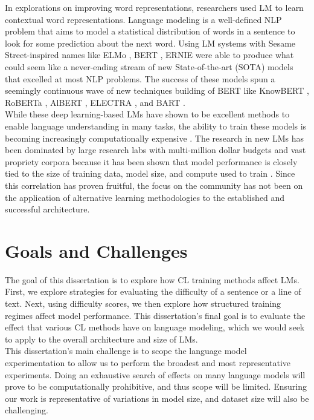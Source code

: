 In explorations on improving word representations, researchers used LM to learn contextual word representations. Language modeling is a well-defined NLP problem that aims to model a statistical distribution of words in a sentence to look for some prediction about the next word. Using LM systems with Sesame Street-inspired names like ELMo \cite{Peters2019KnowledgeEC}, BERT \cite{Devlin2019BERTPO}, ERNIE \cite{Sun2019ERNIEER} were able to produce what could seem like a never-ending stream of new State-of-the-art (SOTA) models that excelled at most NLP problems. The success of these models spun a seemingly continuous wave of new techniques building of BERT like KnowBERT \cite{Peters2019KnowledgeEC}, RoBERTa \cite{Liu2019RoBERTaAR}, AlBERT \cite{Lan2019ALBERTAL}, ELECTRA \cite{Clark2020ELECTRAPT}, and BART \cite{Lewis2019BARTDS}.  \\
While these deep learning-based LMs have shown to be excellent methods to enable language understanding in many tasks, the ability to train these models is becoming increasingly computationally expensive \cite{Strubell2019EnergyAP}. The research in new LMs has been dominated by large research labs with multi-million dollar budgets and vast propriety corpora because it has been shown that model performance is closely tied to the size of training data, model size, and compute used to train \cite{Kaplan2020ScalingLF}. Since this correlation has proven fruitful, the focus on the community has not been on the application of alternative learning methodologies to the established and successful architecture.
\section {Goals and Challenges}
\label{chap:intro:sec:goals}
The goal of this dissertation is to explore how CL training methods affect LMs. First, we explore strategies for evaluating the difficulty of a sentence or a line of text. Next, using difficulty scores, we then explore how structured training regimes affect model performance. This dissertation's final goal is to evaluate the effect that various CL methods have on language modeling, which we would seek to apply to the overall architecture and size of LMs. \\
This dissertation's main challenge is to scope the language model experimentation to allow us to perform the broadest and most representative experiments. Doing an exhaustive search of effects on many language models will prove to be computationally prohibitive, and thus scope will be limited. Ensuring our work is representative of variations in model size, and dataset size will also be challenging. 
